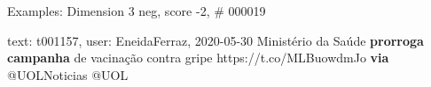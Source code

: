 \begin{frame}{Examples: Dimension 3 neg, score -2, \# 000019}
\footnotesize
\begin{alertblock}{text: t001157, user: EneidaFerraz, 2020-05-30}
Ministério da Saúde \textbf{prorroga} \textbf{campanha} de vacinação contra 
gripe https://t.co/MLBuowdmJo \textbf{via} @UOLNoticias @UOL 
\end{alertblock}
\end{frame}
